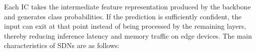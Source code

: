 \documentclass[conference,10pt]{IEEEtran}
\begin{document}

Each IC takes the intermediate feature representation produced by the backbone and generates class probabilities. If the prediction is sufficiently confident, the input can exit at that point instead of being processed by the remaining layers, thereby reducing inference latency and memory traffic on edge devices. The main characteristics of SDNs \cite{kaya2019sdn} are as follows:
\end{document}

